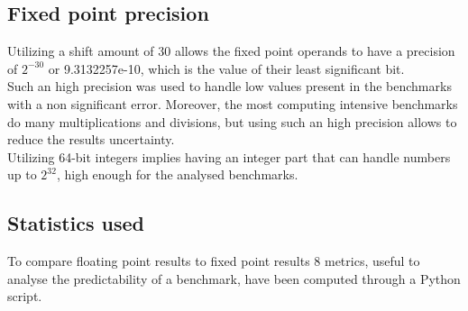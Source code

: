 \subsection{Fixed point precision}
Utilizing a shift amount of 30 allows the fixed point operands to have a precision of ${2}^{-30}$ or 9.3132257e-10, which is the value of their least significant bit.\\
Such an high precision was used to handle low values present in the benchmarks with a non significant error. Moreover, the most computing intensive benchmarks do many multiplications and divisions, but using such an high precision allows to reduce the results uncertainty.\\
Utilizing 64-bit integers implies having an integer part that can handle numbers up to ${2}^{32}$, high enough for the analysed benchmarks.
\subsection{Statistics used}
To compare floating point results to fixed point results 8 metrics, useful to analyse the predictability of a benchmark, have been computed through a Python script.

